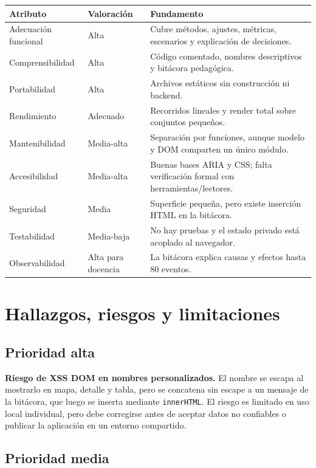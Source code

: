 \documentclass[11pt,a4paper]{article}
\begin{document}
\begin{longtable}{p{}p{}p{}}
\toprule
\textbf{Atributo} & \textbf{Valoración} & \textbf{Fundamento}\\
\midrule
\endhead
Adecuación funcional & Alta & Cubre métodos, ajustes, métricas, escenarios y explicación de decisiones.\\
Comprensibilidad & Alta & Código comentado, nombres descriptivos y bitácora pedagógica.\\
Portabilidad & Alta & Archivos estáticos sin construcción ni backend.\\
Rendimiento & Adecuado & Recorridos lineales y render total sobre conjuntos pequeños.\\
Mantenibilidad & Media-alta & Separación por funciones, aunque modelo y DOM comparten un único módulo.\\
Accesibilidad & Media-alta & Buenas bases ARIA y CSS; falta verificación formal con herramientas/lectores.\\
Seguridad & Media & Superficie pequeña, pero existe inserción HTML en la bitácora.\\
Testabilidad & Media-baja & No hay pruebas y el estado privado está acoplado al navegador.\\
Observabilidad & Alta para docencia & La bitácora explica causas y efectos hasta 80 eventos.\\
\bottomrule
\end{longtable}

\section{Hallazgos, riesgos y limitaciones}

\subsection{Prioridad alta}

\textbf{Riesgo de XSS DOM en nombres personalizados.} El nombre se escapa al
mostrarlo en mapa, detalle y tabla, pero se concatena sin escape a un mensaje de la
bitácora, que luego se inserta mediante \texttt{innerHTML}. El riesgo es limitado
en uso local individual, pero debe corregirse antes de aceptar datos no confiables
o publicar la aplicación en un entorno compartido.

\subsection{Prioridad media}
\end{document}
